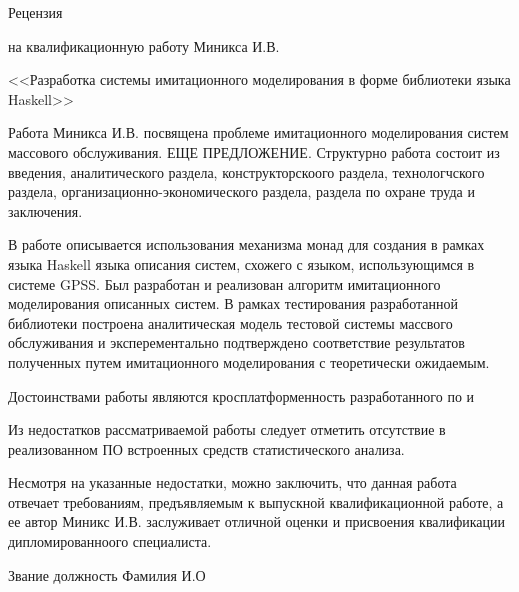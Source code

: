 \documentclass[utf8x, 14pt]{G7-32} %
\begin{document}
\thispagestyle{empty} 
\begin{center}
Рецензия

на квалификационную работу Миникса И.В.

<<Разработка системы имитационного моделирования в форме библиотеки языка Haskell>>

\end{center}

Работа Миникса И.В. посвящена проблеме имитационного моделирования систем массового обслуживания. ЕЩЕ ПРЕДЛОЖЕНИЕ. Структурно работа состоит из введения, аналитического раздела, конструкторскоого раздела, технологчского раздела, организационно-экономического раздела, раздела по охране труда и заключения. 

В работе описывается использования механизма монад для создания в рамках языка Haskell языка описания систем, схожего с языком, использующимся в системе GPSS. Был разработан и реализован алгоритм имитационного моделирования описанных систем. В рамках тестирования разработанной библиотеки построена аналитическая модель тестовой системы массвого обслуживания и эксперементально подтверждено соответствие результатов полученных путем имитационного моделирования с теоретически ожидаемым.

Достоинствами работы являются кросплатформенность разработанного по и 

Из недостатков рассматриваемой работы следует отметить отсутствие в реализованном ПО встроенных средств статистического анализа.

Несмотря на указанные недостатки, можно заключить, что данная работа отвечает требованиям, предъявляемым к выпускной квалификационной работе, а ее автор Миникс И.В. заслуживает отличной оценки и присвоения квалификации дипломированноого специалиста.

\vspace{1cm}

Звание должность \hspace{5cm} Фамилия И.О
\end{document}

